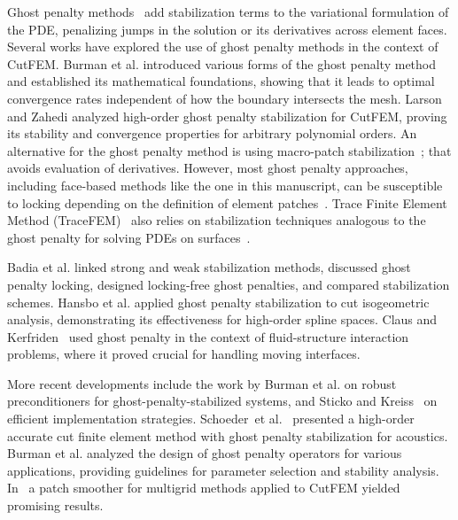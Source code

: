 \documentclass[11pt,a4paper]{article}
\begin{document}
Ghost penalty methods~\cite{burman2010ghost} add stabilization terms to the variational formulation of the PDE,
penalizing jumps in the solution or its derivatives across element faces. Several works have explored the use of ghost
penalty methods in the context of CutFEM. Burman et al. \cite{burman2015cutfem, burman2014fictitious, burman2016full}
introduced various forms of the ghost penalty method and established its mathematical foundations, showing that it
leads to optimal convergence rates independent of how the boundary intersects the mesh. Larson and Zahedi
\cite{larson2020stabilization} analyzed high-order ghost penalty stabilization for CutFEM, proving its stability and
convergence properties for arbitrary polynomial orders. An alternative for the ghost penalty method is using
macro-patch stabilization~\cite{gurkan2019stabilized, preuss2018higher}; that avoids evaluation of derivatives.
However, most ghost penalty approaches, including face-based methods like the one in this manuscript, can be
susceptible to locking depending on the definition of element patches~\cite{badia2022linking, burman2022design}. Trace
Finite Element Method (TraceFEM)~\cite{lehrenfeld2018stabilized, heister2024adaptive, jankuhn2021trace} also relies on
stabilization techniques analogous to the ghost penalty for solving PDEs on surfaces~\cite{heister2024adaptive}.

Badia et al. \cite{badia2022linking} linked strong and weak stabilization methods, discussed ghost penalty locking,
designed locking-free ghost penalties, and compared stabilization schemes. Hansbo et al. \cite{hansbo2017cut} applied
ghost penalty stabilization to cut isogeometric analysis, demonstrating its effectiveness for high-order spline spaces.
Claus and Kerfriden~\cite{claus2019cutfem} used ghost penalty in the context of fluid-structure interaction problems,
where it proved crucial for handling moving interfaces.

More recent developments include the work by Burman et al. \cite{burman2022cutfem} on robust preconditioners for
ghost-penalty-stabilized systems, and {Sticko and Kreiss}~\cite{sticko2016stabilized} on efficient implementation
strategies. {Schoeder}~et al.~\cite{schoeder2020high} presented a high-order accurate cut finite element method with
ghost penalty stabilization for acoustics. Burman et al. \cite{burman2022design} analyzed the design of ghost penalty
operators for various applications, providing guidelines for parameter selection and stability analysis.
In~\cite{cui2025multigrid} a patch smoother for multigrid methods applied to CutFEM yielded promising results.
\end{document}
